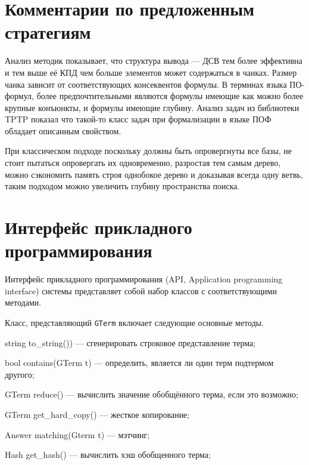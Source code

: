 \section{Комментарии по предложенным стратегиям} %
Анализ методик показывает, что структура вывода --- ДСВ тем более эффективна и тем выше её КПД чем больше элементов может содержаться в чанках. Размер чанка зависит от соответствующих консеквентов формулы. В терминах языка ПО-формул, более предпочтительными являются формулы имеющие как можно более крупные конъюнкты, и формулы имеющие глубину. Анализ задач из библиотеки TPTP показал что такой-то класс задач при формализации в языке ПОФ обладает описанным свойством.

При классическом подходе поскольку должны быть опровергнуты все базы, не стоит пытаться опровергать их одновременно, разростая тем самым дерево, можно сэкономить память строя однобокое дерево и доказывая всегда одну ветвь, таким подходом можно увеличить глубину пространства поиска.


\section{Интерфейс прикладного программирования}
Интерфейс прикладного программирования (API, Application programming interface) системы представляет собой набор классов с соответствующими методами.

Класс, представляющий \texttt{GTerm} включает следующие основные методы.
\begin{description}
  \item{string to\_string())} --- сгенерировать строковое представление терма;
  \item{bool contains(GTerm t)} --- определить, является ли один терм подтермом другого;
  \item{GTerm reduce()} --- вычислить значение обобщённого терма, если это возможно;
  \item{GTerm get\_hard\_copy()} --- жесткое копирование;
  \item{Answer matching(Gterm t)} --- мэтчинг;
  \item{Hash get\_hash()} --- вычислить хэш обобщенного терма;
\end{description}

